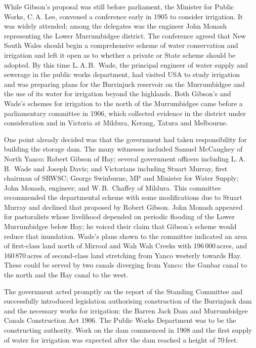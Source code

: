 While Gibson's proposal was still before parliament, the Minister for
Public Works, C.\,A. Lee,  convened a conference
early in 1905 to consider irrigation.  It was widely attended; among
the delegates was the engineer John Monash representing the Lower
Murrumbidgee district.  The conference agreed that New South Wales
should begin a comprehensive scheme of water conservation and
irrigation and left it open as to whether a private or State scheme
should be adopted.  By this time L.\,A.\,B.~Wade, the principal
engineer of water supply and sewerage in the public works department,
had visited USA to study irrigation and was preparing plans for the
Burrinjuck reservoir on the Murrumbidgee and the use of its water for
irrigation beyond the highlands.  Both Gibson's and Wade's schemes for
irrigation to the north of the Murrumbidgee came before a
parliamentary committee in 1906, which collected evidence in the
district under consideration and in Victoria at Mildura, Kerang,
Tatura and Melbourne.

One point already decided was that the government had taken
responsibility for building the storage dam.  The many witnesses
included Samuel McCaughey of North Yanco; Robert Gibson of Hay;
several government officers including L.\,A.\,B.~Wade and Joseph
Davis; and Victorians including Stuart Murray, first chairman of
SRWSC; George Swinburne, MP and Minister for Water Supply; John
Monash, engineer; and W.\,B.~Chaffey of Mildura. This committee
recommended the departmental scheme with some modifications due to
Stuart Murray and declined that proposed by Robert Gibson.  John
Monash appeared for pastoralists whose livelihood depended on periodic
flooding of the Lower Murrumbidgee below Hay; he voiced their claim
that Gibson's scheme would reduce that inundation.  Wade's plans shown
to the committee indicated an area of first-class land north of
Mirrool and Wah Wah Creeks with 196\,000\,acres, and 160\,870\,acres
of second-class land stretching from Yanco westerly towards Hay. These
could be served by two canals diverging from Yanco: the Gunbar canal
 to the north and the Hay canal  to the
west.

The government acted promptly on the report of the Standing Committee
and successfully introduced legislation authorising construction of
the Burrinjuck dam and the necessary works for irrigation: the Barren
Jack Dam and Murrumbidgee Canals Construction Act 1906.  The Public
Works Department was to be the constructing authority.  Work on the
dam commenced in 1908 and the first supply of water for irrigation was
expected after the dam reached a height of
70\,feet.

